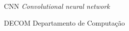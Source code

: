 
\begin{siglas}
    \item[CNN] \textit{Convolutional neural network}
    \item[DECOM] Departamento de Computação
\end{siglas}

